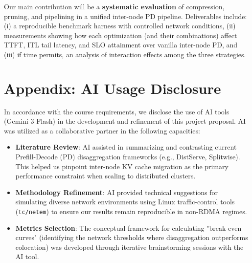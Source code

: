 \documentclass{article} %
\begin{document}
Our main contribution will be a \textbf{systematic evaluation} of compression, pruning, and pipelining in a unified inter-node PD pipeline. Deliverables include: (i) a reproducible benchmark harness with controlled network conditions, (ii) measurements showing how each optimization (and their combinations) affect TTFT, ITL tail latency, and SLO attainment over vanilla inter-node PD, and (iii) if time permits, an analysis of interaction effects among the three strategies.






\section*{Appendix: AI Usage Disclosure}

In accordance with the course requirements, we disclose the use of AI tools (Gemini 3 Flash) in the development and refinement of this project proposal. AI was utilized as a collaborative partner in the following capacities:

\begin{itemize}
    \item \textbf{Literature Review}: AI assisted in summarizing and contrasting current Prefill-Decode (PD) disaggregation frameworks (e.g., DistServe, Splitwise). This helped us pinpoint inter-node KV cache migration as the primary performance constraint when scaling to distributed clusters.
    \item \textbf{Methodology Refinement}: AI provided technical suggestions for simulating diverse network environments using Linux traffic-control tools (\texttt{tc/netem}) to ensure our results remain reproducible in non-RDMA regimes.
    \item \textbf{Metrics Selection}: The conceptual framework for calculating "break-even curves" (identifying the network thresholds where disaggregation outperforms colocation) was developed through iterative brainstorming sessions with the AI tool.
\end{itemize}
\end{document}
